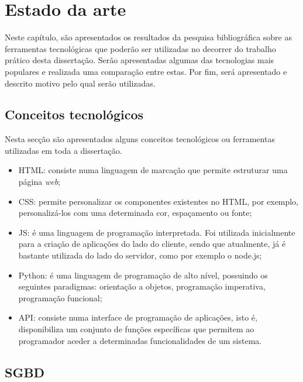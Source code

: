 \chapter{Estado da arte}
\label{state}


Neste capítulo, são apresentados os resultados da pesquisa bibliográfica sobre as ferramentas tecnológicas que poderão ser utilizadas no decorrer do trabalho prático desta dissertação. Serão apresentadas algumas das tecnologias mais populares e realizada uma comparação entre estas. Por fim, será apresentado e descrito motivo pelo qual serão utilizadas. 
 


\section{Conceitos tecnológicos}


Nesta secção são apresentados alguns conceitos tecnológicos ou ferramentas utilizadas em toda a dissertação. 

\begin{itemize}
	\item \ac{HTML}: consiste numa linguagem de marcação que permite estruturar uma página \textit{web}; 
	
	\item \ac{CSS}: permite personalizar os componentes existentes no \linebreak \ac{HTML}, por exemplo, personalizá-los com uma determinada cor,  espaçamento ou fonte;  
	
	\item \ac{JS}: é uma linguagem de programação interpretada. Foi utilizada inicialmente para a criação de aplicações do lado do cliente, sendo que atualmente, já é bastante utilizada do lado do servidor, como por exemplo o node.js; 
	
	\item Python: é uma  linguagem de programação de alto nível, possuindo os seguintes paradigmas:  orientação a objetos, programação imperativa, programação funcional;  
	
	
	\item \ac{API}: consiste numa interface de programação de aplicações, isto é, disponibiliza um conjunto de funções específicas que permitem ao programador aceder a determinadas funcionalidades de um sistema.  
	
\end{itemize}



\section{\acl{SGBD}}

